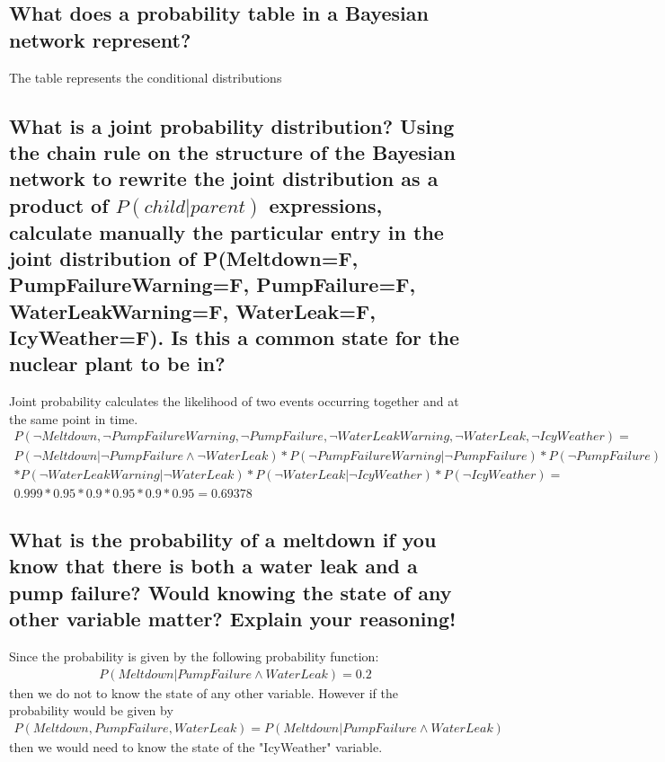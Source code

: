 \documentclass[a4paper,10pt]{article}
\begin{document}
\subsection{What does a probability table in a Bayesian network represent?}

The table represents the conditional distributions

\subsection{What is a joint probability distribution? 
Using the chain rule on the structure of the Bayesian network to rewrite the joint distribution as a product of 
$P(child|parent)$ expressions, calculate manually the particular entry in the joint distribution of 
P(Meltdown=F, PumpFailureWarning=F, PumpFailure=F, WaterLeakWarning=F, WaterLeak=F, IcyWeather=F). 
Is this a common state for the nuclear plant to be in?}

Joint probability calculates the likelihood of two events occurring together and at the same point in time. 
\begin{align*}
	P(\neg Meltdown, \neg PumpFailureWarning, \neg PumpFailure, \neg WaterLeakWarning, \neg WaterLeak, \neg IcyWeather) = \\
	P(\neg Meltdown | \neg PumpFailure \wedge \neg WaterLeak) * P(\neg PumpFailureWarning | \neg PumpFailure) * P(\neg PumpFailure) \\ 
	* P(\neg WaterLeakWarning | \neg WaterLeak) * P(\neg WaterLeak | \neg IcyWeather) * P(\neg IcyWeather) = \\
	0.999 * 0.95 * 0.9 * 0.95 * 0.9 * 0.95 = 0.69378
\end{align*}

\subsection{What is the probability of a meltdown if you know that there is both a water leak and a pump failure? 
Would knowing the state of any other variable matter? 
Explain your reasoning!}

Since the probability is given by the following probability function:
\begin{align*}
	P(Meltdown | PumpFailure \wedge WaterLeak) = 0.2
\end{align*}
then we do not to know the state of any other variable.
However if the probability would be given by
\begin{align*}
	P(Meltdown, PumpFailure, WaterLeak) = P(Meltdown | PumpFailure \wedge WaterLeak)
\end{align*}
then we would need to know the state of the "IcyWeather" variable.
\end{document}
